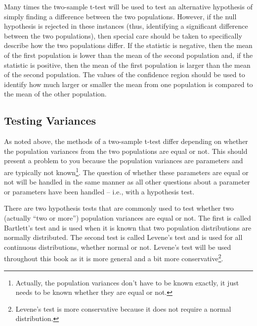 \documentclass[10pt,openany]{book}\usepackage[]{graphicx}\usepackage[]{color}
\begin{document}
Many times the two-sample t-test will be used to test an alternative hypothesis of simply finding a difference between the two populations.  However, if the null hypothesis is rejected in these instances (thus, identifying a significant difference between the two populations), then special care should be taken to specifically describe how the two populations differ.  If the statistic is negative, then the mean of the first population is lower than the mean of the second population and, if the statistic is positive, then the mean of the first population is larger than the mean of the second population.  The values of the confidence region should be used to identify how much larger or smaller the mean from one population is compared to the mean of the other population.


\subsection{Testing Variances}
As noted above, the methods of a two-sample t-test differ depending on whether the population variances from the two populations are equal or not.  This should present a problem to you because the population variances are parameters and are typically not known\footnote{Actually, the population variances don't have to be known exactly, it just needs to be known whether they are equal or not.}.  The question of whether these parameters are equal or not will be handled in the same manner as all other questions about a parameter or parameters have been handled -- i.e., with a hypothesis test.


There are two hypothesis tests that are commonly used to test whether two (actually ``two or more'') population variances are equal or not.  The first is called Bartlett's test and is used when it is known that two population distributions are normally distributed.  The second test is called Levene's test and is used for all continuous distributions, whether normal or not.  Levene's test will be used throughout this book as it is more general and a bit more conservative\footnote{Levene's test is more conservative because it does not require a normal distribution.}.
\end{document}
